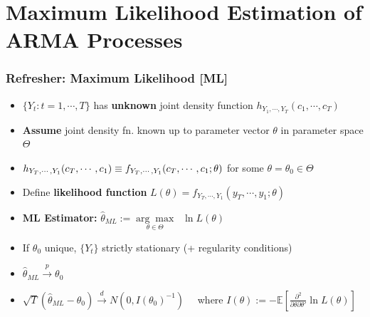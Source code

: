 \documentclass{beamer}
\begin{document}
	
	
	\section{Maximum Likelihood Estimation of ARMA Processes}
	
\begin{frame}
	\frametitle{Refresher: Maximum Likelihood [ML]}
	\begin{itemize}
		\item[]	$\{Y_t: t=1,\cdots, T\}$ has \textbf{unknown} joint density function $h_{Y_1,\cdots, Y_T}(c_1,\cdots,c_T)$
		
		\pause
		\vspace{15pt}
		
		\item[] \textbf{Assume} joint density fn.  known up to parameter vector $\theta$ in parameter space $\Theta$
		\pause
		\vspace{18pt}
		\item[] \hspace{25pt }$h_{\tiny Y_T,\cdots, Y_1}(c_T,\cdots,c_1)\equiv f_{Y_T,\cdots, Y_1}(c_T,\cdots, c_1; \theta)$ for some $\theta=\theta_0\in\Theta$  
			\pause
		\vspace{18pt}
	\item[] Define  \textbf{likelihood function} $L(\theta)=f_{Y_T,\cdots, Y_1}(y_T,\cdots, y_1; \theta) $
		\pause
		\vspace{18pt}
		\item[] \textbf{ML Estimator:} \hspace{15pt } $\hat{\theta}_{ML} := \underset{\theta \in \Theta}{\arg\max} \; \;\ln L(\theta) $
		\pause
		\vspace{35pt}
		\item[] If $\theta_0$ unique, $\{Y_t\}$ strictly stationary (+ regularity conditions)
			\pause
		\vspace{10pt}
		\item[]	\hspace{25pt} $\hat{\theta}_{ML}\overset{p}{\rightarrow} \theta_0$
			\pause
		\vspace{16pt}
		\item[] 	\hspace{25pt}$\sqrt{T}(\hat{\theta}_{ML}-\theta_0) \overset{d}{\rightarrow} N(0, I(\theta_0)^{-1})\quad$ where $I(\theta):=-\mathbb{E}\left [\frac{\partial^2}{\partial \theta \partial \theta'}\ln L(\theta)\right]
$		
		
	\end{itemize}
\end{frame}
\end{document}
